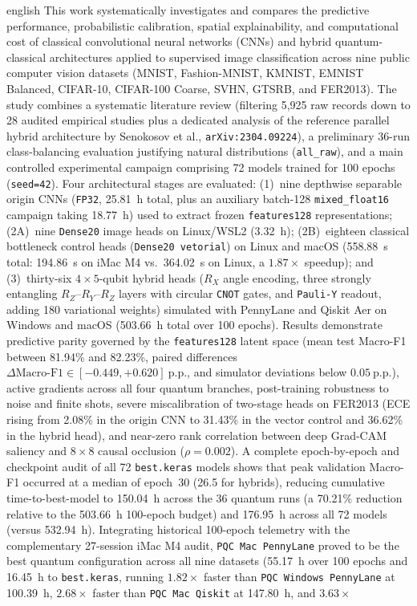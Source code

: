 \documentclass[
    12pt,
    openright,
    oneside,
    a4paper,
    english,
    brazil
]{abntex2}
\begin{document}
\begin{resumo}[Abstract]
\begin{otherlanguage*}{english}
This work systematically investigates and compares the predictive performance, probabilistic calibration, spatial explainability, and computational cost of classical convolutional neural networks (CNNs) and hybrid quantum-classical architectures applied to supervised image classification across nine public computer vision datasets (MNIST, Fashion-MNIST, KMNIST, EMNIST Balanced, CIFAR-10, CIFAR-100 Coarse, SVHN, GTSRB, and FER2013). The study combines a systematic literature review (filtering 5,925 raw records down to 28 audited empirical studies plus a dedicated analysis of the reference parallel hybrid architecture by Senokosov et al., \texttt{arXiv:2304.09224}), a preliminary 36-run class-balancing evaluation justifying natural distributions (\texttt{all\_raw}), and a main controlled experimental campaign comprising 72 models trained for 100 epochs (\texttt{seed=42}). Four architectural stages are evaluated: (1)~nine depthwise separable origin CNNs (\texttt{FP32}, 25.81~h total, plus an auxiliary batch-128 \texttt{mixed\_float16} campaign taking 18.77~h) used to extract frozen \texttt{features128} representations; (2A)~nine \texttt{Dense20} image heads on Linux/WSL2 (3.32~h); (2B)~eighteen classical bottleneck control heads (\texttt{Dense20 vetorial}) on Linux and macOS (558.88~s total: 194.86~s on iMac M4 vs.\ 364.02~s on Linux, a \(1.87\times\) speedup); and (3)~thirty-six \(4 \times 5\)-qubit hybrid heads (\(R_X\) angle encoding, three strongly entangling \(R_Z\text{--}R_Y\text{--}R_Z\) layers with circular \texttt{CNOT} gates, and \texttt{Pauli-Y} readout, adding 180 variational weights) simulated with PennyLane and Qiskit Aer on Windows and macOS (503.66~h total over 100 epochs). Results demonstrate predictive parity governed by the \texttt{features128} latent space (mean test Macro-F1 between 81.94\% and 82.23\%, paired differences \(\Delta\text{Macro-F1} \in [-0.449, +0.620]~\text{p.p.}\), and simulator deviations below \(0.05~\text{p.p.}\)), active gradients across all four quantum branches, post-training robustness to noise and finite shots, severe miscalibration of two-stage heads on FER2013 (ECE rising from 2.08\% in the origin CNN to 31.43\% in the vector control and 36.62\% in the hybrid head), and near-zero rank correlation between deep Grad-CAM saliency and \(8 \times 8\) causal occlusion (\(\rho = 0.002\)). A complete epoch-by-epoch and checkpoint audit of all 72 \texttt{best.keras} models shows that peak validation Macro-F1 occurred at a median of epoch~30 (26.5 for hybrids), reducing cumulative time-to-best-model to 150.04~h across the 36 quantum runs (a 70.21\% reduction relative to the 503.66~h 100-epoch budget) and 176.95~h across all 72 models (versus 532.94~h). Integrating historical 100-epoch telemetry with the complementary 27-session iMac M4 audit, \texttt{PQC Mac PennyLane} proved to be the best quantum configuration across all nine datasets (55.17~h over 100 epochs and 16.45~h to \texttt{best.keras}, running \(1.82\times\) faster than \texttt{PQC Windows PennyLane} at 100.39~h, \(2.68\times\) faster than \texttt{PQC Mac Qiskit} at 147.80~h, and \(3.63\times\) 
\end{otherlanguage*}
\end{resumo}
\end{document}
